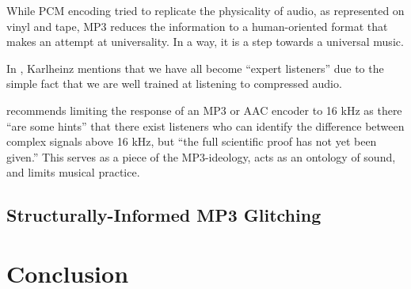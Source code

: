 \documentclass{thesis}
\begin{document}
While PCM encoding tried to replicate the physicality of audio, as represented on vinyl and tape, MP3 reduces the information to a human-oriented format that makes an attempt at universality. In a way, it is a step towards a universal music.

In \cite[9]{karlheinz_brandenburg_mp3_1999}, Karlheinz mentions that we have all become ``expert listeners'' due to the simple fact that we are well trained at listening to compressed audio.

\cite[10]{karlheinz_brandenburg_mp3_1999} recommends limiting the response of an MP3 or AAC encoder to 16 kHz as there ``are some hints'' that there exist listeners who can identify the difference between complex signals above 16 kHz, but ``the full scientific proof has not yet been given.'' This serves as a piece of the MP3-ideology, acts as an ontology of sound, and limits musical practice.
	
\section{Structurally-Informed MP3 Glitching}

\chapter{Conclusion}



\end{document}

